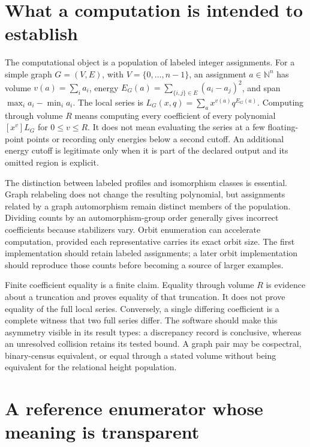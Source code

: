 \documentclass[
  11pt,
  a4paper,
]{report}
\begin{document}
\hypertarget{what-a-computation-is-intended-to-establish}{%
\section{What a computation is intended to
establish}\label{what-a-computation-is-intended-to-establish}}

The computational object is a population of labeled integer assignments.
For a simple graph \(G=(V,E)\), with \(V=\{0,\ldots,n-1\}\), an
assignment \(a\in\mathbb N^n\) has volume \(v(a)=\sum_i a_i\), energy
\(E_G(a)=\sum_{\{i,j\}\in E}(a_i-a_j)^2\), and span
\(\max_i a_i-\min_i a_i\). The local series is
\(L_G(x,q)=\sum_a x^{v(a)}q^{E_G(a)}\). Computing through volume \(R\)
means computing every coefficient of every polynomial \([x^v]L_G\) for
\(0\le v\le R\). It does not mean evaluating the series at a few
floating-point points or recording only energies below a second cutoff.
An additional energy cutoff is legitimate only when it is part of the
declared output and its omitted region is explicit.

The distinction between labeled profiles and isomorphism classes is
essential. Graph relabeling does not change the resulting polynomial,
but assignments related by a graph automorphism remain distinct members
of the population. Dividing counts by an automorphism-group order
generally gives incorrect coefficients because stabilizers vary. Orbit
enumeration can accelerate computation, provided each representative
carries its exact orbit size. The first implementation should retain
labeled assignments; a later orbit implementation should reproduce those
counts before becoming a source of larger examples.

Finite coefficient equality is a finite claim. Equality through volume
\(R\) is evidence about a truncation and proves equality of that
truncation. It does not prove equality of the full local series.
Conversely, a single differing coefficient is a complete witness that
two full series differ. The software should make this asymmetry visible
in its result types: a discrepancy record is conclusive, whereas an
unresolved collision retains its tested bound. A graph pair may be
cospectral, binary-census equivalent, or equal through a stated volume
without being equivalent for the relational height population.

\hypertarget{a-reference-enumerator-whose-meaning-is-transparent}{%
\section{A reference enumerator whose meaning is
transparent}\label{a-reference-enumerator-whose-meaning-is-transparent}}
\end{document}
